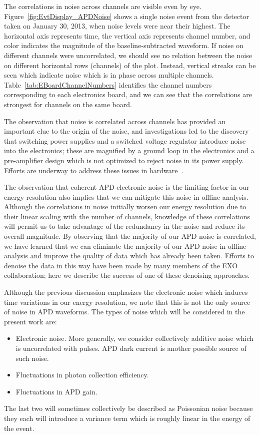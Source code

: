 The correlations in noise across channels are visible even by eye.  Figure~\ref{fig:EvtDisplay_APDNoise} shows a single noise event from the detector taken on January 30, 2013, when noise levels were near their highest.  The horizontal axis represents time, the vertical axis represents channel number, and color indicates the magnitude of the baseline-subtracted waveform.  If noise on different channels were uncorrelated, we should see no relation between the noise on different horizontal rows (channels) of the plot.  Instead, vertical streaks can be seen which indicate noise which is in phase across multiple channels.  Table~\ref{tab:EBoardChannelNumbers} identifies the channel numbers corresponding to each electronics board, and we can see that the correlations are strongest for channels on the same board.

The observation that noise is correlated across channels has provided an important clue to the origin of the noise, and investigations led to the discovery that switching power supplies and a switched voltage regulator introduce noise into the electronics; these are magnified by a ground loop in the electronics and a pre-amplifier design which is not optimized to reject noise in its power supply.  Efforts are underway to address these issues in hardware~\cite{ElectronicsUpgradeReport_Dec2013,ElectronicsUpgradeReport_March2014}.

The observation that coherent APD electronic noise is the limiting factor in our energy resolution also implies that we can mitigate this noise in offline analysis.  Although the correlations in noise initially worsen our energy resolution due to their linear scaling with the number of channels, knowledge of these correlations will permit us to take advantage of the redundancy in the noise and reduce its overall magnitude.  By observing that the majority of our APD noise is correlated, we have learned that we can eliminate the majority of our APD noise in offline analysis and improve the quality of data which has already been taken.  Efforts to denoise the data in this way have been made by many members of the EXO collaboration; here we describe the success of one of these denoising approaches.

Although the previous discussion emphasizes the electronic noise which induces time variations in our energy resolution, we note that this is not the only source of noise in APD waveforms.  The types of noise which will be considered in the present work are:
\begin{itemize}
\item Electronic noise.  More generally, we consider collectively additive noise which is uncorrelated with pulses.  APD dark current is another possible source of such noise.
\item Fluctuations in photon collection efficiency.
\item Fluctuations in APD gain.
\end{itemize}
The last two will sometimes collectively be described as Poissonian noise because they each will introduce a variance term which is roughly linear in the energy of the event.

